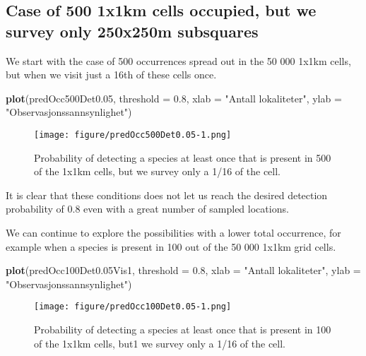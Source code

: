 \documentclass[]{article}
\newenvironment{Shaded}{\begin{snugshade}}{\end{snugshade}}
\newcommand{\KeywordTok}[1]{\textcolor[rgb]{0.13,0.29,0.53}{\textbf{#1}}}
\newcommand{\DataTypeTok}[1]{\textcolor[rgb]{0.13,0.29,0.53}{#1}}
\newcommand{\DecValTok}[1]{\textcolor[rgb]{0.00,0.00,0.81}{#1}}
\newcommand{\FloatTok}[1]{\textcolor[rgb]{0.00,0.00,0.81}{#1}}
\newcommand{\StringTok}[1]{\textcolor[rgb]{0.31,0.60,0.02}{#1}}
\newcommand{\NormalTok}[1]{#1}
\begin{document}
\subsection{Case of 500 1x1km cells occupied, but we survey only
250x250m
subsquares}\label{case-of-500-1x1km-cells-occupied-but-we-survey-only-250x250m-subsquares}

We start with the case of 500 occurrences spread out in the 50 000 1x1km
cells, but when we visit just a 16th of these cells once.

\begin{Shaded}
\begin{Highlighting}[]
\KeywordTok{plot}\NormalTok{(predOcc500Det0.}\DecValTok{05}\NormalTok{, }\DataTypeTok{threshold =} \FloatTok{0.8}\NormalTok{, }\DataTypeTok{xlab =} \StringTok{"Antall lokaliteter"}\NormalTok{, }\DataTypeTok{ylab =} \StringTok{"Observasjonssannsynlighet"}\NormalTok{)}
\end{Highlighting}
\end{Shaded}

\begin{figure}
\centering
\texttt{[image: figure/predOcc500Det0.05-1.png]}
\caption{Probability of detecting a species at least once that is
present in 500 of the 1x1km cells, but we survey only a 1/16 of the
cell.}
\end{figure}

It is clear that these conditions does not let us reach the desired
detection probability of 0.8 even with a great number of sampled
locations.

We can continue to explore the possibilities with a lower total
occurrence, for example when a species is present in 100 out of the 50
000 1x1km grid cells.

\begin{Shaded}
\begin{Highlighting}[]
\KeywordTok{plot}\NormalTok{(predOcc100Det0.05Vis1, }\DataTypeTok{threshold =} \FloatTok{0.8}\NormalTok{, }\DataTypeTok{xlab =} \StringTok{"Antall lokaliteter"}\NormalTok{, }\DataTypeTok{ylab =} \StringTok{"Observasjonssannsynlighet"}\NormalTok{)}
\end{Highlighting}
\end{Shaded}

\begin{figure}
\centering
\texttt{[image: figure/predOcc100Det0.05-1.png]}
\caption{Probability of detecting a species at least once that is
present in 100 of the 1x1km cells, but1 we survey only a 1/16 of the
cell.}
\end{figure}
\end{document}
